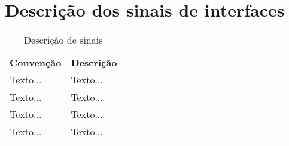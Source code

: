 \section{Descrição dos sinais de interfaces} %
\label{sec:sinais_externos}


\begin{table}[h]
   \centering
    {\renewcommand\arraystretch{1.25}
       \caption{Descrição de sinais}
       \vspace{0.3cm}
        \begin{tabular}{ l l }
         \cline{1-1}\cline{2-2}  
         \multicolumn{1}{|p{3.850cm}|}{\textbf{Convenção} \centering } &
         \multicolumn{1}{p{8cm}|}{\textbf{Descrição} \centering }
           \\  
           \cline{1-1}\cline{2-2}  
          \multicolumn{1}{|p{3.850cm}|}{\vspace{0.3cm} Texto... \centering } &
           \multicolumn{1}{p{8cm}|}{Texto... \centering }
             \\  
             \cline{1-1}\cline{2-2}  
             \multicolumn{1}{|p{3.850cm}|}{\vspace{0.4cm} Texto... \centering } &
             \multicolumn{1}{p{8cm}|}{Texto... \centering }
               \\  
               \cline{1-1}\cline{2-2}  
               \multicolumn{1}{|p{3.850cm}|}{\vspace{0.1cm} Texto... \centering } &
               \multicolumn{1}{p{8cm}|}{Texto... \centering } 
              \\
               \cline{1-1}\cline{2-2}
               \multicolumn{1}{|p{3.850cm}|}{\vspace{0.1cm} Texto... \centering } & 
               \multicolumn{1}{p{8cm}|}{Texto... \centering }
                \\
                   \hline
                   
               \end{tabular}  }
                   \end{table}
